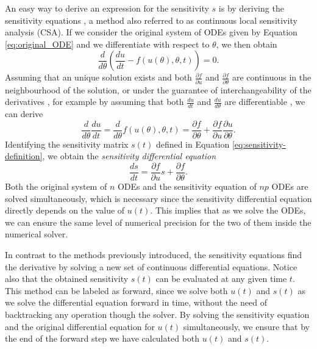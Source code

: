 An easy way to derive an expression for the sensitivity $s$ is by deriving the sensitivity equations \cite{ramsay2017dynamic}, a method also referred to as continuous local sensitivity analysis (CSA). 
If we consider the original system of ODEs given by Equation \eqref{eq:original_ODE} and we differentiate with respect to $\theta$, we then obtain
\begin{equation}
    \frac{d}{d\theta} \left( \frac{du}{dt}  - f(u(\theta), \theta, t) \right) = 0.
\end{equation}
Assuming that an unique solution exists and both $\frac{\partial f}{\partial u}$ and $\frac{\partial f}{\partial \theta}$ are continuous in the neighbourhood of the solution, or under the guarantee of interchangeability of the derivatives \cite{gronwall1919note}, for example by assuming that both $\frac{du}{dt}$ and $\frac{du}{d\theta}$ are differentiable \cite{math8111947}, we can derive
\begin{equation}
 \frac{d}{d\theta} \frac{du}{dt} 
 =
 \frac{d}{d\theta} f(u(\theta), \theta, t)
 = 
 \frac{\partial f}{\partial \theta}
 + 
 \frac{\partial f}{\partial u} \frac{\partial u}{\partial \theta}.
\end{equation}
Identifying the sensitivity matrix $s(t)$ defined in Equation \eqref{eq:sensitivity-definition}, we obtain the \textit{sensitivity differential equation} 
\begin{equation}
 \frac{ds}{dt} = \frac{\partial f}{\partial u} s + \frac{\partial f}{\partial \theta}.
 \label{eq:sensitivity_equations}
\end{equation}
Both the original system of $n$ ODEs and the sensitivity equation of $np$ ODEs are solved simultaneously, which is necessary since the sensitivity differential equation directly depends on the value of $u(t)$.  
This implies that as we solve the ODEs, we can ensure the same level of numerical precision for the two of them inside the numerical solver.

In contrast to the methods previously introduced, the sensitivity equations find the derivative by solving a new set of continuous differential equations.
Notice also that the obtained sensitivity $s(t)$ can be evaluated at any given time $t$. 
This method can be labeled as forward, since we solve both $u(t)$ and $s(t)$ as we solve the differential equation forward in time, without the need of backtracking any operation though the solver.
By solving the sensitivity equation and the original differential equation for $u(t)$ simultaneously, we ensure that by the end of the forward step we have calculated both $u(t)$ and $s(t)$. 